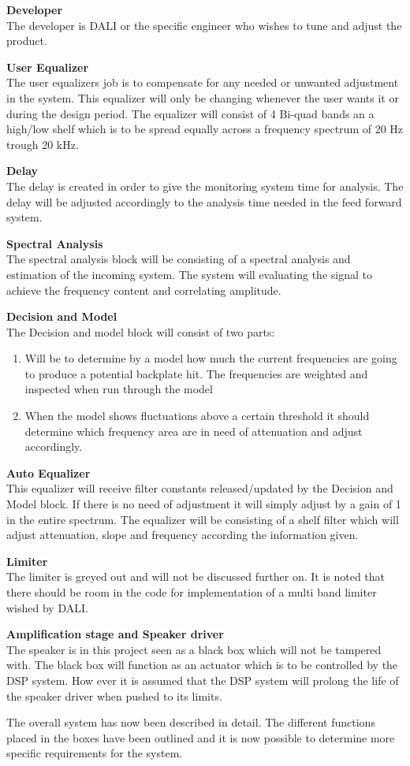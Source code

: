 \textbf{Developer} \\
The developer is DALI or the specific engineer who wishes to tune and adjust the product.

\textbf{User Equalizer} \\
The user equalizers job is to compensate for any needed or unwanted adjustment in the system. This equalizer will only be changing whenever the user wants it or during the design period. The equalizer will consist of 4 Bi-quad bands an a high/low shelf which is to be spread equally across a frequency spectrum of 20 Hz trough 20 kHz.

\textbf{Delay} \\
The delay is created in order to give the monitoring system time for analysis. The delay will be adjusted accordingly to the analysis time needed in the feed forward system.


\textbf{Spectral Analysis} \\
The spectral analysis block will be consisting of a spectral analysis and estimation of the incoming system. The system will evaluating the signal to achieve the frequency content and correlating amplitude.

\textbf{Decision and Model} \\
The Decision and model block will consist of two parts:
\begin{enumerate}
\item Will be to determine by a model how much the current frequencies are going to produce a potential backplate hit. The frequencies are weighted and inspected when run through the model
\item When the model shows fluctuations above a certain threshold it should determine which frequency area are in need of attenuation and adjust accordingly.
\end{enumerate}

\textbf{Auto Equalizer} \\
This equalizer will receive filter constants released/updated by the Decision and Model block. If there is no need of adjustment it will simply adjust by a gain of 1 in the entire spectrum. The equalizer will be consisting of a shelf filter which will adjust attenuation, slope and frequency according the information given. 

\textbf{Limiter} \\
The limiter is greyed out and will not be discussed further on. It is noted that there should be room in the code for implementation of a multi band limiter wished by DALI.

\textbf{Amplification stage and Speaker driver} \\
The speaker is in this project seen as a black box which will not be tampered with. The black box will function as an actuator which is to be controlled by the DSP system. How ever it is assumed that the DSP system will prolong the life of the speaker driver when pushed to its limits.


\vspace{5mm}
The overall system has now been described in detail. The different functions placed in the boxes have been outlined and it is now possible to determine more specific requirements for the system.
